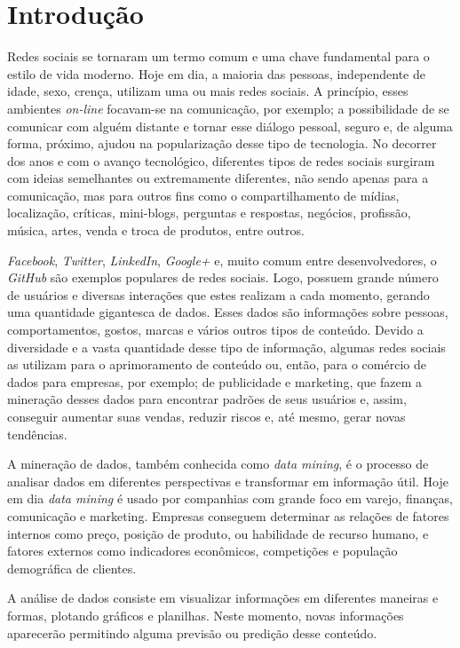 \chapter{Introdução}\label{ch:introducao}

Redes sociais se tornaram um termo comum e uma chave fundamental para o estilo de vida moderno. Hoje em dia, a maioria das pessoas, independente de idade, sexo, crença, utilizam uma ou mais redes sociais. A princípio, esses ambientes \textit{on-line} focavam-se na comunicação, por exemplo; a possibilidade de se comunicar com alguém distante e tornar esse diálogo pessoal, seguro e, de alguma forma, próximo, ajudou na popularização desse tipo de tecnologia. No decorrer dos anos e com o avanço tecnológico, diferentes tipos de redes sociais surgiram com ideias semelhantes ou extremamente diferentes, não sendo apenas para a comunicação, mas para outros fins como o compartilhamento de mídias, localização, críticas, mini-blogs, perguntas e respostas, negócios, profissão, música, artes, venda e troca de produtos, entre outros.

\textit{Facebook}, \textit{Twitter}, \textit{LinkedIn}, \textit{Google+} e, muito comum entre desenvolvedores, o \textit{GitHub} são exemplos populares de redes sociais. Logo, possuem grande número de usuários e diversas interações que estes realizam a cada momento, gerando uma quantidade gigantesca de dados. Esses dados são informações sobre pessoas, comportamentos, gostos, marcas e vários outros tipos de conteúdo. Devido a diversidade e a vasta quantidade desse tipo de informação, algumas redes sociais as utilizam para o aprimoramento de conteúdo ou, então, para o comércio de dados para empresas, por exemplo; de publicidade e marketing, que fazem a mineração desses dados para encontrar padrões de seus usuários e, assim, conseguir aumentar suas vendas, reduzir riscos e, até mesmo, gerar novas tendências.

A mineração de dados, também conhecida como \textit{data mining}, é o processo de analisar dados em diferentes perspectivas e transformar em informação útil. Hoje em dia \textit{data mining} é usado por companhias com grande foco em varejo, finanças, comunicação e marketing. Empresas conseguem determinar as relações de fatores internos como preço, posição de produto, ou habilidade de recurso humano, e fatores externos como indicadores econômicos, competições e população demográfica de clientes.

A análise de dados consiste em visualizar informações em diferentes maneiras e formas, plotando gráficos e planilhas. Neste momento, novas informações aparecerão permitindo alguma previsão ou predição desse conteúdo.

